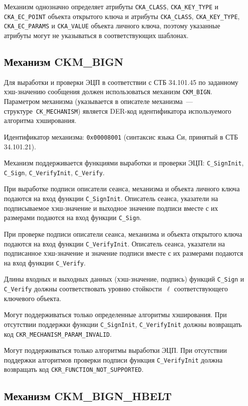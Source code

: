 Механизм однозначно определяет атрибуты 
\verb|CKA_CLASS|, \verb|CKA_KEY_TYPE| и \verb|CKA_EC_POINT|
объекта открытого ключа и атрибуты
\verb|CKA_CLASS|, \verb|CKA_KEY_TYPE|, \verb|CKA_EC_PARAMS| и 
\verb|CKA_VALUE| объекта личного ключа,
поэтому указанные атрибуты могут не указываться в
соответствующих шаблонах.

\subsection{Механизм CKM\_BIGN}\label{CRYPTOKI.SignHSpec}

Для выработки и проверки ЭЦП в соответствии с СТБ 34.101.45 по 
заданному хэш-значению сообщения должен использоваться механизм 
\verb|CKM_BIGN|. 
%
Параметром механизма (указывается в описателе механизма~--- 
структуре~\verb|CK_MECHANISM|) является DER-код идентификатора 
используемого алгоритма хэширования.

Идентификатор механизма: \texttt{0x00008001} 
(синтаксис языка Си, принятый в СТБ 34.101.21). 

Механизм поддерживается функциями выработки и проверки ЭЦП: 
\verb|C_SignInit|, \verb|C_Sign|, \verb|C_VerifyInit|, \verb|C_Verify|.

При выработке подписи описатели сеанса, механизма и объекта
личного ключа подаются на вход функции \verb|C_SignInit|.
Описатель сеанса, указатели на подписываемое хэш-значение и выходное 
значение подписи вместе с их размерами подаются на вход функции 
\verb|C_Sign|.

При проверке подписи описатели сеанса, механизма и объекта
открытого ключа подаются на вход функции \verb|C_VerifyInit|.
Описатель сеанса, указатели на подписанное хэш-значение и значение подписи 
вместе с их размерами подаются на вход функции \verb|C_Verify|.

Длины входных и выходных данных (хэш-значение, подпись) функций
\verb|C_Sign| и \verb|C_Verify| должны соответствовать
уровню стойкости~$\ell$ соответствующего ключевого объекта.

Могут поддерживаться только определенные алгоритмы хэширования.
При отсутствии поддержки функции \verb|C_SignInit|,
\verb|C_VerifyInit| должны возвращать код 
\verb|CKR_MECHANISM_PARAM_INVALID|.

Могут поддерживаться только алгоритмы выработки ЭЦП.
При отсутствии поддержки алгоритмов проверки подписи
функция \verb|C_VerifyInit| должна возвращать код 
\verb|CKR_FUNCTION_NOT_SUPPORTED|.

\subsection{Механизм CKM\_BIGN\_HBELT}\label{CRYPTOKI.SignHBelt}

